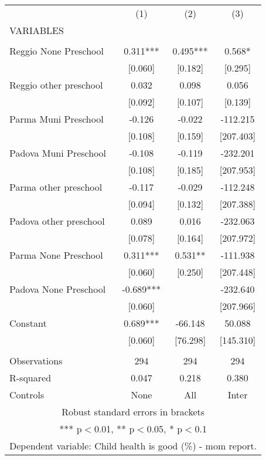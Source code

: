 \begin{tabular}{lccc} \hline
 & (1) & (2) & (3) \\
VARIABLES &  &  &  \\ \hline
 &  &  &  \\
Reggio None Preschool & 0.311*** & 0.495*** & 0.568* \\
 & [0.060] & [0.182] & [0.295] \\
Reggio other preschool & 0.032 & 0.098 & 0.056 \\
 & [0.092] & [0.107] & [0.139] \\
Parma Muni Preschool & -0.126 & -0.022 & -112.215 \\
 & [0.108] & [0.159] & [207.403] \\
Padova Muni Preschool & -0.108 & -0.119 & -232.201 \\
 & [0.108] & [0.185] & [207.953] \\
Parma other preschool & -0.117 & -0.029 & -112.248 \\
 & [0.094] & [0.132] & [207.388] \\
Padova other preschool & 0.089 & 0.016 & -232.063 \\
 & [0.078] & [0.164] & [207.972] \\
Parma None Preschool & 0.311*** & 0.531** & -111.938 \\
 & [0.060] & [0.250] & [207.448] \\
Padova None Preschool & -0.689*** &  & -232.640 \\
 & [0.060] &  & [207.966] \\
Constant & 0.689*** & -66.148 & 50.088 \\
 & [0.060] & [76.298] & [145.310] \\
 &  &  &  \\
Observations & 294 & 294 & 294 \\
R-squared & 0.047 & 0.218 & 0.380 \\
 Controls & None & All & Inter \\ \hline
\multicolumn{4}{c}{ Robust standard errors in brackets} \\
\multicolumn{4}{c}{ *** p$<$0.01, ** p$<$0.05, * p$<$0.1} \\
\multicolumn{4}{c}{ Dependent variable: Child health is good (\%) - mom report.} \\
\end{tabular}
